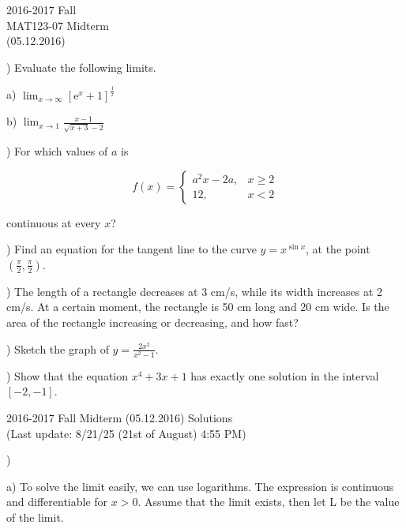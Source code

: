 \documentclass{article}
\begin{document}
\pagestyle{empty}
\large

\begin{center}
2016-2017 Fall \\MAT123-07 Midterm\\(05.12.2016)
\end{center}

) Evaluate the following limits.

\hfill

\noindent a) $\displaystyle \lim_{x \to \infty} [\mathrm{e}^x + 1]^{\frac{1}{x}}$

\hfill

\noindent b) $\displaystyle \lim_{x \to 1} \frac{x-1}{\sqrt{x+3} - 2}$

\hfill

) For which values of $a$ is

\[
f(x) =
\begin{cases}
a^2x - 2a, & x \geq 2 \\
12,  & x < 2
\end{cases}
\]

\noindent continuous at every $x$?

\hfill

) Find an equation for the tangent line to the curve $ y = x^{\sin x}$, at the point $(\frac{\pi}{2}, \frac{\pi}{2})$.

\hfill

) The length of a rectangle decreases at 3 cm/s, while its width increases at 2 cm/s. At a certain moment, the rectangle is 50 cm long and 20 cm wide. Is the area of the rectangle increasing or decreasing, and how fast?

\hfill

) Sketch the graph of $\displaystyle y = \frac{2x^2}{x^2-1}$.

\hfill

) Show that the equation $x^4 + 3x + 1$ has exactly one solution in the interval $[-2, -1]$.

\newpage

\begin{center}
2016-2017 Fall Midterm (05.12.2016) Solutions\\
(Last update: 8/21/25 (21st of August) 4:55 PM)
\end{center}

)

\hfill

\noindent a) To solve the limit easily, we can use logarithms. The expression is continuous and differentiable for $x > 0$. Assume that the limit exists, then let L be the value of the limit.
\end{document}
